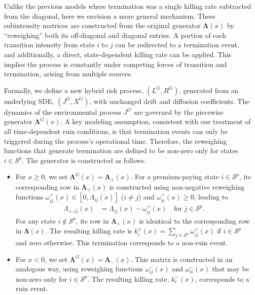 \documentclass[11pt]{article}
\numberwithin{table}{section}
\numberwithin{figure}{section}
\numberwithin{equation}{section}
\newcommand{\1}{{\mathbf 1}}
\newcommand{\0}{\mat{0}}
\begin{document}
Unlike the previous models where termination was a single killing rate subtracted from the diagonal, here we envision a more general mechanism. These subintensity matrices are constructed from the original generator \(\bm{\Lambda}(x)\) by ``reweighing'' both its off-diagonal and diagonal entries. A portion of each transition intensity from state \(i\) to \(j\) can be redirected to a termination event, and additionally, a direct, state-dependent killing rate can be applied. This implies the process is constantly under competing forces of transition and termination, arising from multiple sources.

Formally, we define a new hybrid risk process, \((L^G, R^G)\), generated from an underlying SDE, \((J^G, X^G)\), with unchanged drift and diffusion coefficients. The dynamics of the environmental process \(J^G\) are governed by the piecewise generator \(\bm{\Lambda}^G(x)\). A key modeling assumption, consistent with our treatment of all time-dependent ruin conditions, is that termination events can only be triggered during the process's operational time. Therefore, the reweighing functions that generate termination are defined to be non-zero only for states \(i \in \mathcal{S}^p\). The generator is constructed as follows.
\begin{itemize}
    \item For \(x \ge 0\), we set \(\bm{\Lambda}^G(x) = \bm{\Lambda}_+(x)\). For a premium-paying state \(i \in \mathcal{S}^p\), its corresponding row in \(\bm{\Lambda}_+(x)\) is constructed using non-negative reweighing functions \(\omega^+_{ij}(x) \in [0,\Lambda_{ij}(x)]\) (\(i \neq j\)) and \(\omega^+_{ii}(x) \ge 0\), leading to
    \begin{align*}
    \Lambda_{+,ij}(x) &= \Lambda_{ij}(x) - \omega^+_{ij}(x) \quad \text{for } j \in\mathcal{S}^p.
    \end{align*}
    For any state \(i \notin \mathcal{S}^p\), its row in \(\bm{\Lambda}_+(x)\) is identical to the corresponding row in \(\bm{\Lambda}(x)\). The resulting killing rate is \(k^+_i(x) = \sum_{j \in\mathcal{S}^p} \omega^+_{ij}(x)\) if \(i \in \mathcal{S}^p\) and zero otherwise. This termination corresponds to a non-ruin event.
    \item For \(x < 0\), we set \(\bm{\Lambda}^G(x) = \bm{\Lambda}_-(x)\). This matrix is constructed in an analogous way, using reweighing functions \(\omega^-_{ij}(x)\) and \(\omega^-_{ii}(x)\) that may be non-zero only for \(i \in \mathcal{S}^p\). The resulting killing rate, \(k^-_i(x)\), corresponds to a ruin event.
\end{itemize}
\end{document}
